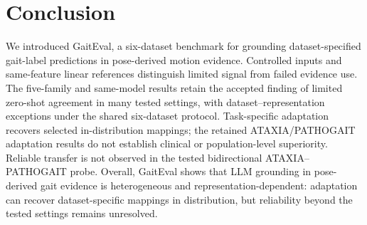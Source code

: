 \section{Conclusion}
We introduced GaitEval, a six-dataset benchmark for grounding dataset-specified gait-label predictions in pose-derived motion evidence. Controlled inputs and same-feature linear references distinguish limited signal from failed evidence use. The five-family and same-model results retain the accepted finding of limited zero-shot agreement in many tested settings, with dataset--representation exceptions under the shared six-dataset protocol. Task-specific adaptation recovers selected in-distribution mappings; the retained ATAXIA/PATHOGAIT adaptation results do not establish clinical or population-level superiority. Reliable transfer is not observed in the tested bidirectional ATAXIA--PATHOGAIT probe. Overall, GaitEval shows that LLM grounding in pose-derived gait evidence is heterogeneous and representation-dependent: adaptation can recover dataset-specific mappings in distribution, but reliability beyond the tested settings remains unresolved.
